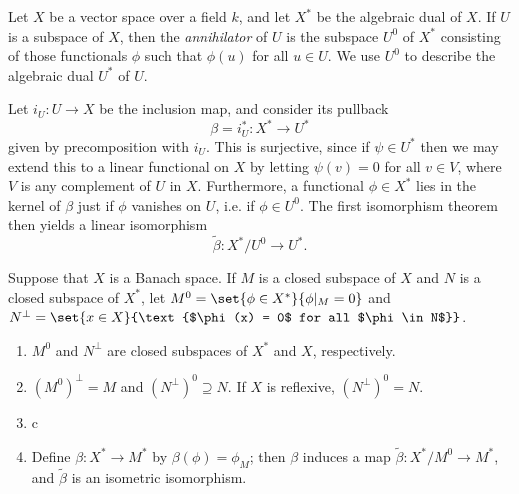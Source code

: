 \documentclass[article, a4paper, 11pt, oneside]{memoir}
\numberwithin{equation}{chapter}
\theoremstyle{nonumberplain}
\begin{document}
\begin{remark}
	Let $X$ be a vector space over a field $k$, and let $X^*$ be the algebraic dual of $X$. If $U$ is a subspace of $X$, then the \emph{annihilator} of $U$ is the subspace $U^0$ of $X^*$ consisting of those functionals $\phi$ such that $\phi(u)$ for all $u \in U$. We use $U^0$ to describe the algebraic dual $U^*$ of $U$.

	Let $i_U \colon U \to X$ be the inclusion map, and consider its pullback
	\begin{equation*}
		\beta = i_U^* \colon X^* \to U^*
	\end{equation*}
	given by precomposition with $i_U$. This is surjective, since if $\psi \in U^*$ then we may extend this to a linear functional on $X$ by letting $\psi(v) = 0$ for all $v \in V$, where $V$ is any complement of $U$ in $X$. Furthermore, a functional $\phi \in X^*$ lies in the kernel of $\beta$ just if $\phi$ vanishes on $U$, i.e. if $\phi \in U^0$. The first isomorphism theorem then yields a linear isomorphism
	\begin{equation*}
		\tilde{\beta} \colon X^*/U^0 \to U^*.
	\end{equation*}
\end{remark}


\begin{exerciseframed*}[23]
	Suppose that $X$ is a Banach space. If $M$ is a closed subspace of $X$ and $N$ is a closed subspace of $X^*$, let $M^0 = \set{\phi \in X^*}{\phi|_M = 0}$ and $N^\perp = \set{x \in X}{\text{$\phi(x) = 0$ for all $\phi \in N$}}$.
	\begin{enumerate}
		\item $M^0$ and $N^\perp$ are closed subspaces of $X^*$ and $X$, respectively.
		\item $(M^0)^\perp = M$ and $(N^\perp)^0 \supseteq N$. If $X$ is reflexive, $(N^\perp)^0 = N$.
		\item c
		\item Define $\beta \colon X^* \to M^*$ by $\beta(\phi) = \phi_M$; then $\beta$ induces a map $\tilde{\beta} \colon X^*/M^0 \to M^*$, and $\tilde{\beta}$ is an isometric isomorphism.
	\end{enumerate}
\end{exerciseframed*}
\end{document}

